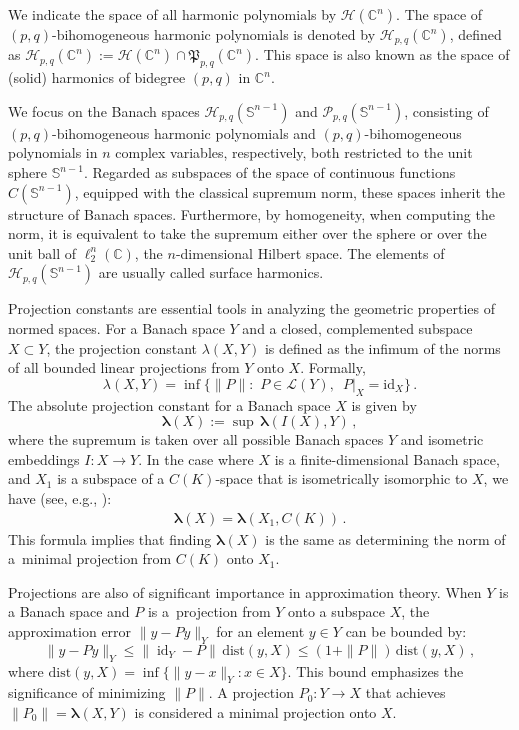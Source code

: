 \documentclass[12pt]{amsart}
\numberwithin{subsection}{section}
\theoremstyle{definition}
\theoremstyle{remark}
\DeclareMathOperator{\id}{\mathrm{id}}
\begin{document}
We indicate the space of all harmonic polynomials by  $\mathcal{H}(\mathbb{C}^n) $. The space of  $(p,q) $-bihomogeneous harmonic polynomials is denoted by  $\mathcal{H}_{p,q}(\mathbb{C}^n) $, defined as  $\mathcal{H}_{p,q}(\mathbb{C}^n) := \mathcal{H}(\mathbb{C}^n) \cap \mathfrak{P}_{p,q}(\mathbb{C}^n) $. This space is also known as the space of (solid) harmonics of bidegree $(p,q)$ in $\mathbb{C}^n$.


We focus on the Banach spaces $\mathcal{H}_{p,q}(\mathbb{S}^{n-1}) $ and $ \mathcal{P}_{p,q}(\mathbb{S}^{n-1}) $, consisting of $(p,q)$-bihomogeneous harmonic polynomials and $(p,q)$-bihomogeneous polynomials in $n$ complex variables, respectively, both restricted to the unit sphere $ \mathbb{S}^{n-1} $. Regarded as subspaces of the space of continuous functions $ C(\mathbb{S}^{n-1}) $, equipped with the classical supremum norm, these spaces inherit the structure of Banach spaces.  Furthermore, by homogeneity,  when computing the norm, it is equivalent to take the supremum either over the sphere or over the unit ball of $\ell_2^n(\mathbb{C})$, the $n$-dimensional Hilbert space.
The elements of $ \mathcal{H}_{p,q}(\mathbb{S}^{n-1}) $ are usually called surface harmonics.

Projection constants are essential tools in analyzing the geometric properties of normed spaces. For a Banach space $Y$ and a closed, complemented subspace $X\subset Y$, the projection constant $\lambda(X, Y) $ is defined as the
infimum  of the norms of all bounded linear projections from $Y$ onto $X$. Formally,
\[
\lambda(X, Y) = \inf \big\{ \|P\| : \,\, P \in \mathcal{L}(Y), \,\,\, P|_{X} = \text{id}_{X}\big\}\,.
\]
The absolute projection constant for a Banach space  $ X  $ is given by
\[
\boldsymbol{\lambda}(X) := \sup \, \boldsymbol{\lambda}(I(X),Y)\,,
\]
where the supremum is taken over all possible Banach spaces  $ Y  $ and isometric embeddings  $ I \colon X \to Y  $. In
the case where  $ X  $ is a finite-dimensional Banach space, and  $ X_1  $ is a subspace of a  $ C(K)  $-space that is
isometrically isomorphic to  $X$, we have  (see, e.g., \cite[III.B.5 Theorem]{wojtaszczyk1996banach}):
\begin{align}\label{eq: l_infty inyective}
\boldsymbol{\lambda}(X) = \boldsymbol{\lambda}(X_1, C(K))\,.
\end{align}
This formula implies that finding  $\boldsymbol{\lambda}(X)  $ is the same as determining the norm of a~minimal projection
from $C(K)$ onto $X_1$.

Projections are also of significant importance in approximation theory. When  $Y$ is a Banach space and  $P$ is a~projection
from  $ Y  $ onto a subspace  $X$, the approximation error  $\|y - Py\|_Y  $ for an element $ y \in Y  $
can be bounded by:
\[
\|y - Py\|_Y \leq \|\id_Y - P\| \, \text{dist}(y, X) \leq (1 + \|P\|) \, \text{dist}(y, X)\,,
\]
where  $ \text{dist}(y, X) = \inf\{\|y - x\|_Y \colon  x \in X\}  $. This bound emphasizes the significance of minimizing  $\|P\|$.
A projection  $P_0 \colon Y \to X$ that achieves  $\|P_0\| = \boldsymbol{\lambda}(X, Y)$ is considered a minimal projection onto $X$.
\end{document}
